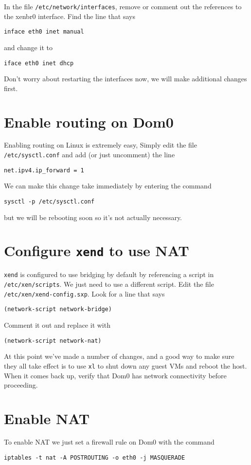 \documentclass{article}
\begin{document}
In the file \texttt{/etc/network/interfaces}, remove or comment out the references to the xenbr0 interface. Find the line that says

\texttt{inface eth0 inet manual} 

and change it to

\texttt{iface eth0 inet dhcp}

Don't worry about restarting the interfaces now, we will make additional changes first.

\section{Enable routing on Dom0} 
Enabling routing on Linux is extremely easy, Simply edit the file \texttt{/etc/sysctl.conf} and add (or just 
uncomment) the line

\texttt{net.ipv4.ip\_forward = 1}

We can make this change take immediately by entering the command

\texttt{sysctl -p /etc/sysctl.conf}

but we will be rebooting soon so it's not actually necessary.

\section{Configure \texttt{xend} to use NAT}
\texttt{xend} is configured to use bridging by default by referencing a script in \texttt{/etc/xen/scripts}. We just need to 
use a different script. Edit the file \texttt{/etc/xen/xend-config.sxp}. Look for a line that says 

\texttt{(network-script network-bridge)}

Comment it out and replace it with 

\texttt{(network-script network-nat)}

At this point we've made a number of changes, and a good way to make sure they all take effect is to use \texttt{xl} 
to shut down any guest VMs and reboot the host. When it comes back up, verify that Dom0 has network connectivity 
before proceeding.

\section{Enable NAT}
To enable NAT we just set a firewall rule on Dom0 with the command

\texttt{iptables -t nat -A POSTROUTING -o eth0 -j MASQUERADE}
\end{document}
